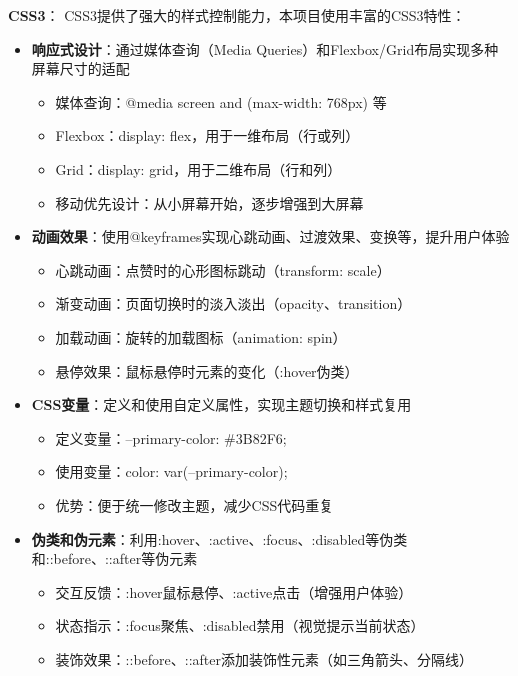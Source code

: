 \documentclass[12pt,a4paper]{article}
\begin{document}
\textbf{CSS3}：
CSS3提供了强大的样式控制能力，本项目使用丰富的CSS3特性：

\begin{itemize}
    \item \textbf{响应式设计}：通过媒体查询（Media Queries）和Flexbox/Grid布局实现多种屏幕尺寸的适配
        \begin{itemize}
            \item 媒体查询：@media screen and (max-width: 768px) 等
            \item Flexbox：display: flex，用于一维布局（行或列）
            \item Grid：display: grid，用于二维布局（行和列）
            \item 移动优先设计：从小屏幕开始，逐步增强到大屏幕
        \end{itemize}
    \item \textbf{动画效果}：使用@keyframes实现心跳动画、过渡效果、变换等，提升用户体验
        \begin{itemize}
            \item 心跳动画：点赞时的心形图标跳动（transform: scale）
            \item 渐变动画：页面切换时的淡入淡出（opacity、transition）
            \item 加载动画：旋转的加载图标（animation: spin）
            \item 悬停效果：鼠标悬停时元素的变化（:hover伪类）
        \end{itemize}
    \item \textbf{CSS变量}：定义和使用自定义属性，实现主题切换和样式复用
        \begin{itemize}
            \item 定义变量：--primary-color: \#3B82F6;
            \item 使用变量：color: var(--primary-color);
            \item 优势：便于统一修改主题，减少CSS代码重复
        \end{itemize}
    \item \textbf{伪类和伪元素}：利用:hover、:active、:focus、:disabled等伪类和::before、::after等伪元素
        \begin{itemize}
            \item 交互反馈：:hover鼠标悬停、:active点击（增强用户体验）
            \item 状态指示：:focus聚焦、:disabled禁用（视觉提示当前状态）
            \item 装饰效果：::before、::after添加装饰性元素（如三角箭头、分隔线）
        \end{itemize}
\end{itemize}
\end{document}
